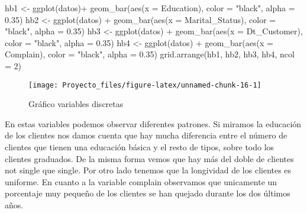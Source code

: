 \documentclass[
]{article}
\newenvironment{Shaded}{\begin{snugshade}}{\end{snugshade}}
\newcommand{\AttributeTok}[1]{\textcolor[rgb]{0.77,0.63,0.00}{#1}}
\newcommand{\DecValTok}[1]{\textcolor[rgb]{0.00,0.00,0.81}{#1}}
\newcommand{\FloatTok}[1]{\textcolor[rgb]{0.00,0.00,0.81}{#1}}
\newcommand{\FunctionTok}[1]{\textcolor[rgb]{0.00,0.00,0.00}{#1}}
\newcommand{\NormalTok}[1]{#1}
\newcommand{\OtherTok}[1]{\textcolor[rgb]{0.56,0.35,0.01}{#1}}
\newcommand{\SpecialCharTok}[1]{\textcolor[rgb]{0.00,0.00,0.00}{#1}}
\newcommand{\StringTok}[1]{\textcolor[rgb]{0.31,0.60,0.02}{#1}}
\begin{document}
\begin{Shaded}
\begin{Highlighting}[]
\NormalTok{hb1 }\OtherTok{\textless{}{-}} \FunctionTok{ggplot}\NormalTok{(datos)}\SpecialCharTok{+}
  \FunctionTok{geom\_bar}\NormalTok{(}\FunctionTok{aes}\NormalTok{(}\AttributeTok{x =}\NormalTok{ Education), }\AttributeTok{color =} \StringTok{"black"}\NormalTok{, }\AttributeTok{alpha =} \FloatTok{0.35}\NormalTok{)}
\NormalTok{hb2 }\OtherTok{\textless{}{-}} \FunctionTok{ggplot}\NormalTok{(datos) }\SpecialCharTok{+} 
  \FunctionTok{geom\_bar}\NormalTok{(}\FunctionTok{aes}\NormalTok{(}\AttributeTok{x =}\NormalTok{ Marital\_Status), }\AttributeTok{color =} \StringTok{"black"}\NormalTok{, }\AttributeTok{alpha =} \FloatTok{0.35}\NormalTok{)}
\NormalTok{hb3 }\OtherTok{\textless{}{-}} \FunctionTok{ggplot}\NormalTok{(datos) }\SpecialCharTok{+} 
  \FunctionTok{geom\_bar}\NormalTok{(}\FunctionTok{aes}\NormalTok{(}\AttributeTok{x =}\NormalTok{ Dt\_Customer), }\AttributeTok{color =} \StringTok{"black"}\NormalTok{, }\AttributeTok{alpha =} \FloatTok{0.35}\NormalTok{)}
\NormalTok{hb4 }\OtherTok{\textless{}{-}} \FunctionTok{ggplot}\NormalTok{(datos) }\SpecialCharTok{+} 
  \FunctionTok{geom\_bar}\NormalTok{(}\FunctionTok{aes}\NormalTok{(}\AttributeTok{x =}\NormalTok{ Complain), }\AttributeTok{color =} \StringTok{"black"}\NormalTok{, }\AttributeTok{alpha =} \FloatTok{0.35}\NormalTok{)}
\FunctionTok{grid.arrange}\NormalTok{(hb1, hb2, hb3, hb4, }\AttributeTok{ncol =} \DecValTok{2}\NormalTok{)}
\end{Highlighting}
\end{Shaded}

\begin{figure}

{\centering \texttt{[image: Proyecto\_files/figure-latex/unnamed-chunk-16-1]} 

}

\caption{Gráfico variables discretas}\label{fig:unnamed-chunk-16}
\end{figure}

En estas variables podemos observar diferentes patrones. Si miramos la
educación de los clientes nos damos cuenta que hay mucha diferencia
entre el número de clientes que tienen una educación básica y el resto
de tipos, sobre todo los clientes graduados. De la misma forma vemos que
hay más del doble de clientes not single que single. Por otro lado
tenemos que la longividad de los clientes es uniforme. En cuanto a la
variable complain observamos que unicamente un porcentaje muy pequeño de
los clientes se han quejado durante los dos últimos años.
\end{document}
